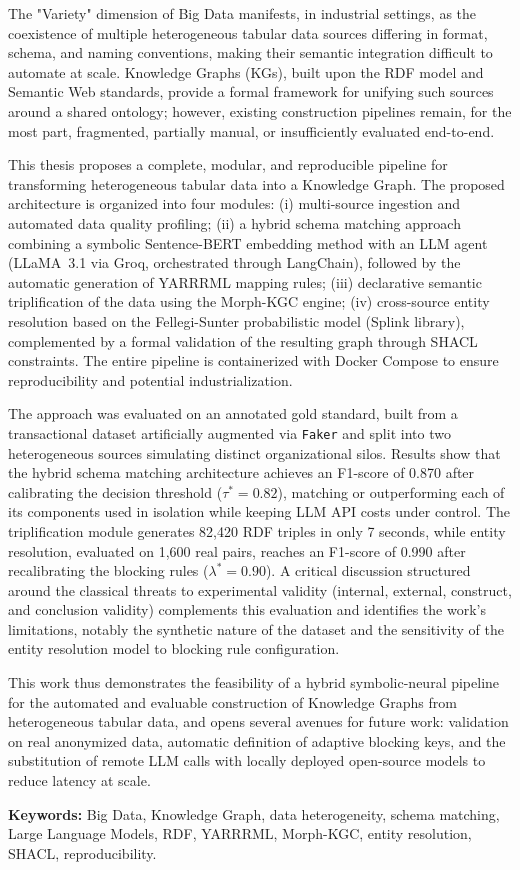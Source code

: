 The "Variety" dimension of Big Data manifests, in industrial
settings, as the coexistence of multiple heterogeneous tabular data
sources differing in format, schema, and naming conventions, making
their semantic integration difficult to automate at scale. Knowledge
Graphs (KGs), built upon the RDF model and Semantic Web standards,
provide a formal framework for unifying such sources around a shared
ontology; however, existing construction pipelines remain, for the
most part, fragmented, partially manual, or insufficiently evaluated
end-to-end.

This thesis proposes a complete, modular, and reproducible pipeline
for transforming heterogeneous tabular data into a Knowledge Graph.
The proposed architecture is organized into four modules: (i)
multi-source ingestion and automated data quality profiling; (ii) a
hybrid schema matching approach combining a symbolic
Sentence-BERT embedding method with an LLM agent (LLaMA~3.1 via Groq,
orchestrated through LangChain), followed by the automatic generation
of YARRRML mapping rules; (iii) declarative semantic triplification
of the data using the Morph-KGC engine; (iv) cross-source entity
resolution based on the Fellegi-Sunter probabilistic model (Splink
library), complemented by a formal validation of the resulting graph
through SHACL constraints. The entire pipeline is containerized with
Docker Compose to ensure reproducibility and potential
industrialization.

The approach was evaluated on an annotated gold standard, built from
a transactional dataset artificially augmented via \texttt{Faker} and
split into two heterogeneous sources simulating distinct
organizational silos. Results show that the hybrid schema matching
architecture achieves an F1-score of 0.870 after calibrating the
decision threshold ($\tau^{*} = 0.82$), matching or outperforming
each of its components used in isolation while keeping LLM API costs
under control. The triplification module generates 82,420 RDF
triples in only 7 seconds, while entity resolution, evaluated on
1,600 real pairs, reaches an F1-score of 0.990 after recalibrating
the blocking rules ($\lambda^{*} = 0.90$). A critical discussion
structured around the classical threats to experimental validity
(internal, external, construct, and conclusion validity) complements
this evaluation and identifies the work's limitations, notably the
synthetic nature of the dataset and the sensitivity of the entity
resolution model to blocking rule configuration.

This work thus demonstrates the feasibility of a hybrid
symbolic-neural pipeline for the automated and evaluable construction
of Knowledge Graphs from heterogeneous tabular data, and opens
several avenues for future work: validation on real anonymized data,
automatic definition of adaptive blocking keys, and the substitution
of remote LLM calls with locally deployed open-source models to
reduce latency at scale.

\vspace{0.8cm}
\noindent\textbf{Keywords:} Big Data, Knowledge Graph, data
heterogeneity, schema matching, Large Language Models, RDF, YARRRML,
Morph-KGC, entity resolution, SHACL, reproducibility.

\newpage